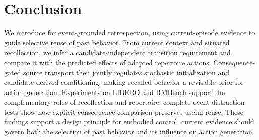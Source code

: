 \vspace{-0.1cm}
\section{Conclusion}
\label{sec:conclusion}
\vspace{-0.1cm}
We introduce \method{} for event-grounded retrospection, using current-episode evidence to guide selective reuse of past behavior.
From current context and situated recollection, we infer a candidate-independent transition requirement and compare it with the predicted effects of adapted repertoire actions.
Consequence-gated source transport then jointly regulates stochastic initialization and candidate-derived conditioning, making recalled behavior a revisable prior for action generation.
Experiments on LIBERO and RMBench support the complementary roles of recollection and repertoire; complete-event distraction tests show how explicit consequence comparison preserves useful reuse.
These findings support a design principle for embodied control: current evidence should govern both the selection of past behavior and its influence on action generation.
